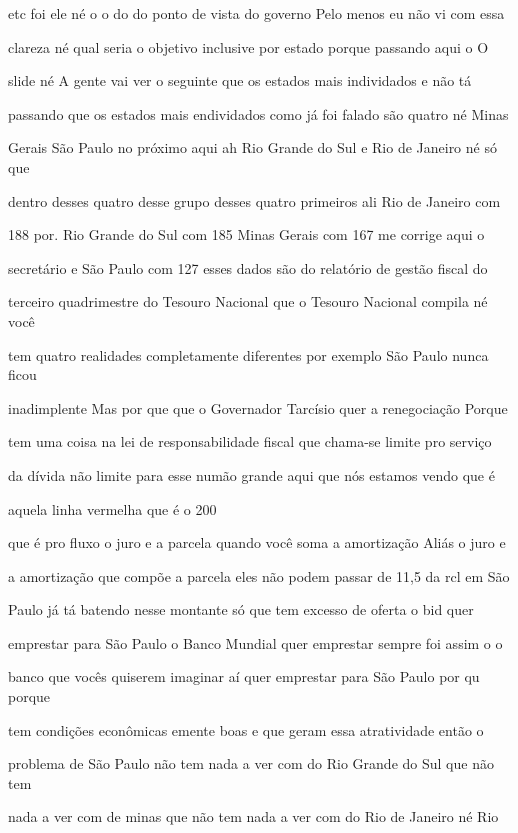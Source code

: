 \documentclass[a4paper,12pt]{article}
\begin{document}
etc foi ele né o o do do ponto de vista do governo Pelo menos eu não vi com essa

clareza né qual seria o objetivo inclusive por estado porque passando aqui o O

slide né A gente vai ver o seguinte que os estados mais individados e não tá

passando que os estados mais endividados como já foi falado são quatro né Minas

Gerais São Paulo no próximo aqui ah Rio Grande do Sul e Rio de Janeiro né só que

dentro desses quatro desse grupo desses quatro primeiros ali Rio de Janeiro com

188 por. Rio Grande do Sul com 185 Minas Gerais com 167 me corrige aqui o

secretário e São Paulo com 127 esses dados são do relatório de gestão fiscal do

terceiro quadrimestre do Tesouro Nacional que o Tesouro Nacional compila né você

tem quatro realidades completamente diferentes por exemplo São Paulo nunca ficou

inadimplente Mas por que que o Governador Tarcísio quer a renegociação Porque

tem uma coisa na lei de responsabilidade fiscal que chama-se limite pro serviço

da dívida não limite para esse numão grande aqui que nós estamos vendo que é

aquela linha vermelha que é o 200%

que é pro fluxo o juro e a parcela quando você soma a amortização Aliás o juro e

a amortização que compõe a parcela eles não podem passar de 11,5 da rcl em São

Paulo já tá batendo nesse montante só que tem excesso de oferta o bid quer

emprestar para São Paulo o Banco Mundial quer emprestar sempre foi assim o o

banco que vocês quiserem imaginar aí quer emprestar para São Paulo por qu porque

tem condições econômicas emente boas e que geram essa atratividade então o

problema de São Paulo não tem nada a ver com do Rio Grande do Sul que não tem

nada a ver com de minas que não tem nada a ver com do Rio de Janeiro né Rio
\end{document}
